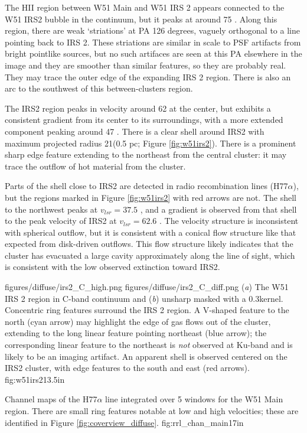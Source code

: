 The HII region between W51 Main and W51 IRS 2 appears connected to the W51 IRS2
bubble in the continuum, but it peaks at around 75 \kms.  Along this region,
there are weak `striations' at PA 126 degrees, vaguely orthogonal to a line
pointing back to IRS 2.  These striations are similar in scale to PSF artifacts
from bright pointlike sources, but no such artifaces are seen at this PA
elsewhere in the image and they are smoother than similar features, so they are
probably real.  They may trace the outer edge of the expanding IRS 2 region.
There is also an arc to the southwest of this between-clusters region.

The IRS2 region peaks in velocity around 62 \kms at the center, but exhibits a
consistent gradient from its center to its surroundings, with a more extended
component peaking around 47 \kms.  There is a clear shell around IRS2
with maximum projected radius 21\arcsec (0.5 pc; Figure \ref{fig:w51irs2}).
There is a prominent sharp edge feature extending to the northeast from the
central cluster: it may trace the outflow of hot material from the cluster.

Parts of the shell close to IRS2 are detected in radio recombination lines
(H77$\alpha$), but the regions marked in Figure \ref{fig:w51irs2} with red
arrows are not.  The shell to the northwest peaks at $v_{lsr}=37.5$ \kms, and a
gradient is observed from that shell to the peak velocity of IRS2 at $v_{lsr} =
62.6$ \kms.  The velocity structure is inconsistent with spherical outflow, but
it is consistent with a conical flow structure like that expected from
disk-driven outflows.  This flow structure likely indicates that the cluster
has evacuated a large cavity approximately along the line of sight, which is
consistent with the low observed extinction toward IRS2.  

\FigureTwo
{figures/diffuse/irs2_C_high.png}
{figures/diffuse/irs2_C_diff.png}
{(\textit{a}) The W51 IRS 2 region in C-band continuum and (\textit{b}) unsharp
masked with a 0.3\arcsec kernel.  Concentric ring features surround the IRS 2
region.  A V-shaped feature to the north (cyan arrow) may highlight the edge of
gas flows out of the cluster, extending to the long linear feature pointing
northeast (blue arrow); the corresponding linear feature to the northeast is
\emph{not} observed at Ku-band and is likely to be an imaging artifact.  An
apparent shell is observed centered on the IRS2 cluster, with edge
features to the south and east (red arrows).
}
{fig:w51irs2}{1}{3.5in}

{Channel maps of the H77$\alpha$ line integrated over 5 \kms windows
for the W51 Main region.  There are small ring features notable at low and high
velocities; these are identified in Figure \ref{fig:coverview_diffuse}.}
{fig:rrl_chan_main}{1}{7in}

